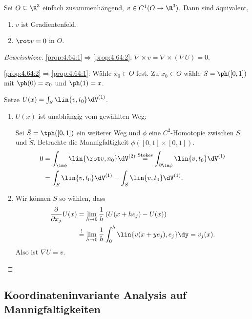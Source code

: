 \begin{prop}
\label{prop:4.64}
Sei $O\subseteq\R^3$ einfach zusammenhängend, $v\in C^1(O\to\R^3)$. Dann sind
äquivalent,
\begin{enumerate}[label=(\roman{*})]
  \item\label{prop:4.64:1} $v$ ist Gradientenfeld.
  \item\label{prop:4.64:2} $\rot v = 0$ in $O$.
\end{enumerate}
\end{prop}

\begin{proof}[Beweisskizze]
\ref{prop:4.64:1}$\Rightarrow$\ref{prop:4.64:2}: $\nabla\times v = \nabla\times
(\nabla U) = 0$.

\ref{prop:4.64:2}$\Rightarrow$\ref{prop:4.64:1}:
 Wähle $x_0\in O$ fest. Zu
$x_0\in O$ wähle $S=\ph([0,1])$ mit $\ph(0) = x_0$ und $\ph(1) = x$.

Setze $U(x) = \int_S \lin{v,t_0}\dV^{(1)}$.
\begin{enumerate}[label=\alph{*})]
\item $U(x)$ ist unabhängig vom gewählten Weg:

Sei $\tilde{S}=\tph([0,1])$ ein weiterer Weg und $\phi$ eine $C^2$-Homotopie
zwischen $S$ und $\tilde{S}$.%
Betrachte die Mannigfaltigkeit $\phi([0,1]\times[0,1])$.
\begin{align*}
0 &= \int_{\im\phi} \lin{\rot v,n_0}\dV^{(2)} \overset{\text{Stokes}}{=}
 \int_{\partial\im\phi} \lin{v,t_0} \dV^{(1)} \\ &= \int_S \lin{v,t_0} \dV^{(1)}
 - \int_{\tilde{S}} \lin{v,t_0} \dV^{(1)}.  
\end{align*}
\item Wir können $S$ so wählen, dass 
\begin{align*}
\frac{\partial}{\partial x_j} U(x) &= \lim\limits_{h\to 0}
\frac{1}{h}\left(U(x+h e_j) - U(x)\right)
\\ &\overset{!}{=}
\lim\limits_{h\to 0} \frac{1}{h}\int_0^h \lin{v(x+ye_j),e_j}\dy
= v_j(x).
\end{align*}
Also ist $\nabla U = v$.
\end{enumerate}
\end{proof}

\subsection{Koordinateninvariante Analysis auf Mannigfaltigkeiten}

